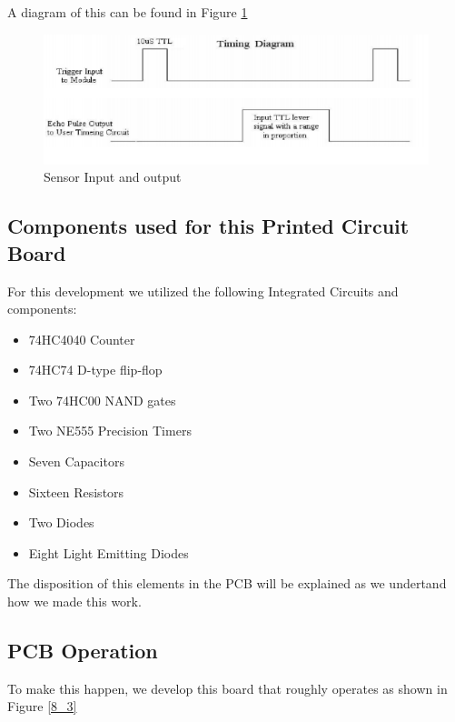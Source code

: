 A diagram of this can be found in Figure \ref{8_2}

\begin{figure}[h!]
\begin{centering}
\includegraphics[scale=0.7]{../Exercise8/Informe/images/SENSOR_DIAGRAM}
\par\end{centering}
\caption{\color{cyan}Sensor Input and output}
\label{8_2}

\end{figure}

\subsection{\color{purple}Components used for this Printed Circuit Board}

For this development we utilized the following Integrated Circuits
and components:
\begin{itemize}
\item 74HC4040 Counter 
\item 74HC74 D-type flip-flop
\item Two 74HC00 NAND gates
\item Two NE555 Precision Timers
\item Seven Capacitors
\item Sixteen Resistors
\item Two Diodes
\item Eight Light Emitting Diodes
\end{itemize}
The disposition of this elements in the PCB will be explained as we
undertand how we made this work.

\subsection{\color{purple}PCB Operation}

To make this happen, we develop this board that roughly operates as
shown in Figure \ref{8_3}


